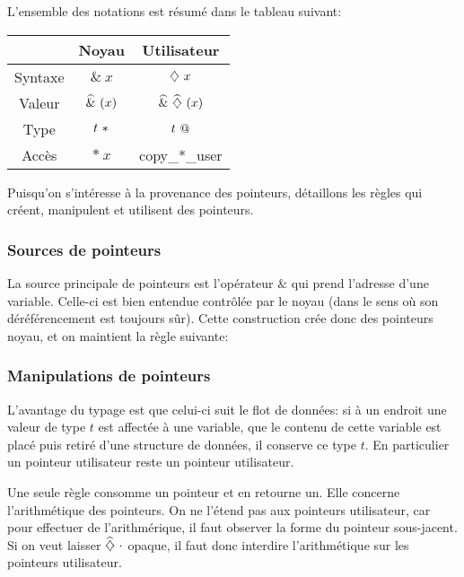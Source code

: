 L'ensemble des notations est résumé dans le tableau suivant:

\begin{center}
\begin{tabular}{ccc}
\toprule
        & Noyau        & Utilisateur \\
\midrule
Syntaxe & $\&~x$       & $\eTaint{x}$ \\
Valeur  & $\wphi{(x)}$ & $\wphi{\vTainted{(x)}}$ \\
Type    & $\ptrK{t}$   & $\ptrU{t}$ \\
Accès   & $*~x$        & copy\_*\_user \\
\bottomrule
\end{tabular}
\end{center}

Puisqu'on s'intéresse à la provenance des pointeurs, détaillons les règles qui
créent, manipulent et utilisent des pointeurs.

\subsubsection*{Sources de pointeurs}

La source principale de pointeurs est l'opérateur $\&$ qui prend l'adresse d'une
variable. Celle-ci est bien entendue contrôlée par le noyau (dans le sens où son
déréférencement est toujours sûr). Cette construction crée donc des pointeurs
noyau, et on maintient la règle suivante:


\begin{mathpar}
\end{mathpar}

\subsubsection*{Manipulations de pointeurs}

L'avantage du typage est que celui-ci suit le flot de données: si à un endroit
une valeur de type $t$ est affectée à une variable, que le contenu de cette
variable est placé puis retiré d'une structure de données, il conserve ce type
$t$. En particulier un pointeur utilisateur reste un pointeur utilisateur.

Une seule règle consomme un pointeur et en retourne un. Elle concerne
l'arithmétique des pointeurs. On ne l'étend pas aux pointeurs utilisateur, car
pour effectuer de l'arithmérique, il faut observer la forme du pointeur
sous-jacent. Si on veut laisser $\phx\vTainted$ opaque, il faut donc interdire
l'arithmétique sur les pointeurs utilisateur.


